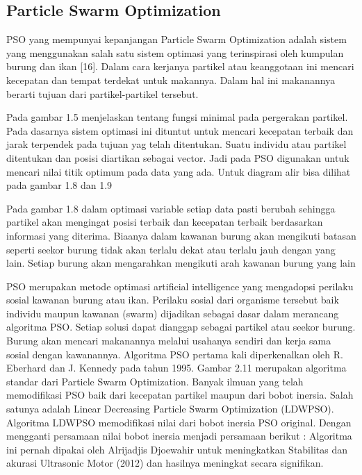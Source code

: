\documentclass[11pt]{article}
\begin{document}
\subsection{Particle Swarm Optimization}
PSO yang mempunyai kepanjangan Particle Swarm Optimization adalah sistem yang menggunakan salah satu sistem optimasi yang terinspirasi oleh kumpulan burung dan ikan [16].
Dalam cara kerjanya partikel atau keanggotaan ini mencari kecepatan dan tempat terdekat untuk makannya.
Dalam hal ini makanannya berarti tujuan dari partikel-partikel tersebut. 

Pada gambar 1.5 menjelaskan tentang fungsi minimal pada pergerakan partikel.
Pada dasarnya sistem optimasi ini dituntut untuk mencari kecepatan terbaik dan jarak terpendek pada tujuan yag telah ditentukan.
Suatu individu atau partikel ditentukan  dan posisi diartikan  sebagai vector.
Jadi pada PSO digunakan untuk mencari nilai titik optimum pada data yang ada.
Untuk diagram alir bisa dilihat pada gambar 1.8 dan 1.9

Pada gambar 1.8  dalam optimasi variable setiap data pasti berubah sehingga partikel akan mengingat posisi terbaik dan kecepatan terbaik berdasarkan informasi yang diterima.
Biaanya dalam kawanan burung akan mengikuti batasan seperti seekor burung tidak akan terlalu dekat atau terlalu jauh dengan yang lain.
Setiap burung akan mengarahkan mengikuti arah kawanan burung yang lain

PSO merupakan metode optimasi artificial intelligence yang  mengadopsi perilaku sosial kawanan burung atau ikan.
Perilaku sosial dari organisme tersebut baik individu maupun kawanan (swarm) dijadikan sebagai dasar dalam merancang algoritma PSO.
Setiap solusi dapat dianggap sebagai partikel atau seekor burung.
Burung akan mencari makanannya melalui usahanya sendiri dan kerja sama sosial dengan kawanannya.
Algoritma PSO  pertama  kali diperkenalkan  oleh  R.  Eberhard  dan  J.  Kennedy  pada  tahun 1995.
Gambar 2.11 merupakan algoritma standar dari Particle Swarm Optimization.
Banyak ilmuan yang telah memodifikasi PSO baik dari kecepatan partikel maupun dari bobot inersia.
Salah satunya adalah Linear Decreasing Particle Swarm Optimization (LDWPSO).
Algoritma LDWPSO memodifikasi nilai dari bobot inersia PSO original.
Dengan mengganti persamaan nilai bobot inersia menjadi persamaan berikut :
Algoritma ini pernah dipakai oleh Alrijadjis Djoewahir untuk meningkatkan Stabilitas dan akurasi Ultrasonic Motor (2012) dan hasilnya meningkat secara signifikan.
\end{document}
